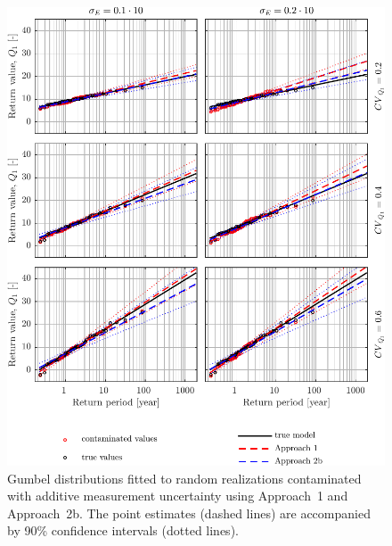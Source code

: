 \begin{figure}[htbp!] 
	\centering    
	\includegraphics[]{Gumbel_additive_me_smallm_50_rng23.pdf}
	\caption{Gumbel distributions fitted to random realizations contaminated with additive measurement uncertainty using Approach~1 and Approach~2b. The point estimates (dashed lines) are accompanied by 90\% confidence intervals (dotted lines).}
	\label{fig:Gumbel_additive_me_smallm}
\end{figure}
